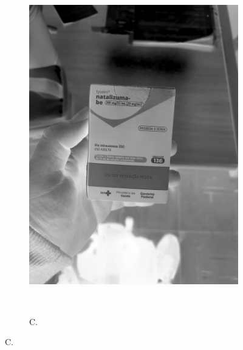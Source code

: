 \begin{figure}[htb]
\begin{subfigure}[t]{0.21\textwidth}
        \includegraphics[width=\linewidth]{../pictures/tysabri_cmyk_k_only.jpg}
    \end{subfigure}
    \\\vspace{\floatsep}
    \begin{subfigure}[t]{0.21\textwidth}
        \centering
        \caption{C.}
        \label{fig:foto:versoes:2:C:boxes}

\end{subfigure}
\end{figure}
